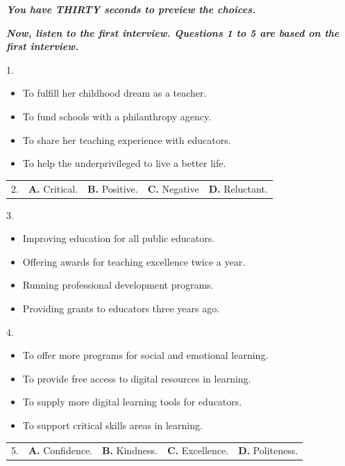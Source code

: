 \documentclass[UTF8,11pt]{ctexart}
\begin{document}
\textbf{\textit{You have THIRTY seconds to preview the choices.}}


\textbf{\textit{Now, listen to the first interview. Questions 1 to 5 are based on the first interview.}}


1.


\begin{itemize}[leftmargin=2em,itemsep=.2em,topsep=.4em]\item[A.] To fulfill her childhood dream as a teacher.
\item[B.] To fund schools with a philanthropy agency.
\item[C.] To share her teaching experience with educators.
\item[D.] To help the underprivileged to live a better life.
\end{itemize}

\noindent\begin{tabularx}{\linewidth}{@{}lXXXX@{}}2. & \textbf{A.} Critical. & \textbf{B.} Positive. & \textbf{C.} Negative & \textbf{D.} Reluctant.\\\end{tabularx}\par

3.


\begin{itemize}[leftmargin=2em,itemsep=.2em,topsep=.4em]\item[A.] Improving education for all public educators.
\item[B.] Offering awards for teaching excellence twice a year.
\item[C.] Running professional development programs.
\item[D.] Providing grants to educators three years ago.
\end{itemize}

4.


\begin{itemize}[leftmargin=2em,itemsep=.2em,topsep=.4em]\item[A.] To offer more programs for social and emotional learning.
\item[B.] To provide free access to digital resources in learning.
\item[C.] To supply more digital learning tools for educators.
\item[D.] To support critical skills areas in learning.
\end{itemize}

\noindent\begin{tabularx}{\linewidth}{@{}lXXXX@{}}5. & \textbf{A.} Confidence. & \textbf{B.} Kindness. & \textbf{C.} Excellence. & \textbf{D.} Politeness.\\\end{tabularx}\par
\end{document}
